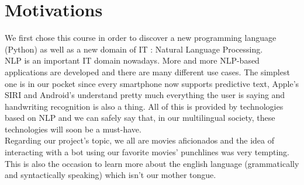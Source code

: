 \section{Motivations}
We first chose this course in order to discover a new programming language (Python) as well as a new domain of IT : Natural Language Processing.\\
NLP is an important IT domain nowadays. More and more NLP-based applications are developed and there are many different use cases. The simplest one is in our pocket since every smartphone now supports predictive text, Apple's SIRI and Android's  understand pretty much everything the user is saying and handwriting recognition is also a thing. All of this is provided by technologies based on NLP and we can safely say that, in our multilingual society, these technologies will soon be a must-have.\\
Regarding our project's topic, we all are movies aficionados and the idea of interacting with a bot using our favorite movies' punchlines was very tempting. This is also the occasion to learn more about the english language (grammatically and syntactically speaking) which isn't our mother tongue.